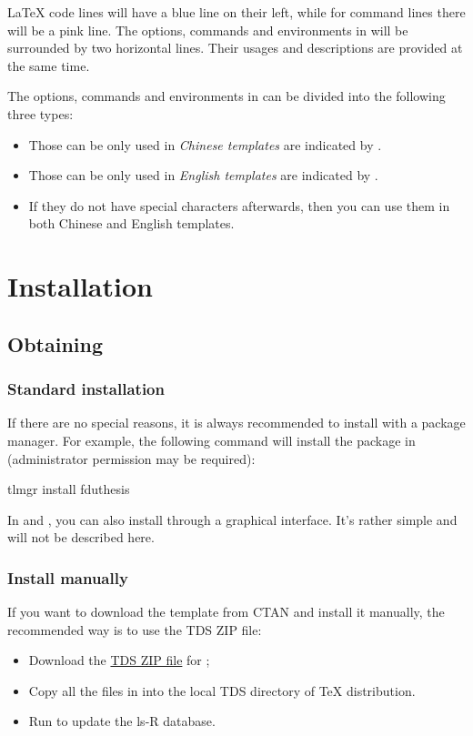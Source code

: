 \documentclass{fdudoc}
\begin{document}
\LaTeX{} code lines will have a blue line on their left, while
for command lines there will be a pink line. The options,
commands and environments in  will be surrounded
by two horizontal lines. Their usages and descriptions are
provided at the same time.

The options, commands and environments in  can be
divided into the following three types:
\begin{itemize}
  \item Those can be only used in \emph{Chinese templates} are
    indicated by \rexptarget\rexpstar{}.
  \item Those can be only used in \emph{English templates} are
    indicated by \rexptarget\expstar{}.
  \item If they do not have special characters afterwards, then
    you can use them in both Chinese and English templates.
\end{itemize}

\section{Installation}

\subsection{Obtaining }

\subsubsection{Standard installation}

If there are no special reasons, it is always recommended to
install  with a package manager. For example,
the following command will install the package in \TeXLive{}
(administrator permission may be required):
\begin{shellexample}[gobble=1,morekeywords={tlmgr,install}]
  tlmgr install fduthesis
\end{shellexample}

In \TeXLive{} and \MiKTeX{}, you can also install 
through a graphical interface. It's rather simple and will not be
described here.

\subsubsection{Install manually}

If you want to download the template from CTAN and install it
manually, the recommended way is to use the TDS ZIP file:
\begin{itemize}
  \item Download the \href{http://mirror.ctan.org/install/macros/latex/contrib/fduthesis.tds.zip}%
    {TDS ZIP file} for ;
  \item Copy all the files in  into the
    local TDS directory of \TeX{} distribution.
  \item Run  to update the ls-R database.
\end{itemize}
\end{document}
